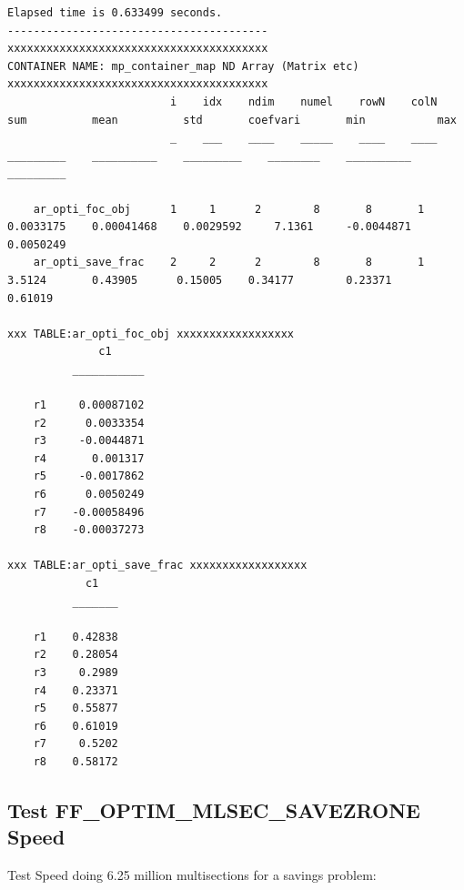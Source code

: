 \documentclass[
]{book}
\begin{document}
\begin{verbatim}
Elapsed time is 0.633499 seconds.
----------------------------------------
xxxxxxxxxxxxxxxxxxxxxxxxxxxxxxxxxxxxxxxx
CONTAINER NAME: mp_container_map ND Array (Matrix etc)
xxxxxxxxxxxxxxxxxxxxxxxxxxxxxxxxxxxxxxxx
                         i    idx    ndim    numel    rowN    colN       sum          mean          std       coefvari       min           max   
                         _    ___    ____    _____    ____    ____    _________    __________    _________    ________    __________    _________

    ar_opti_foc_obj      1     1      2        8       8       1      0.0033175    0.00041468    0.0029592     7.1361     -0.0044871    0.0050249
    ar_opti_save_frac    2     2      2        8       8       1         3.5124       0.43905      0.15005    0.34177        0.23371      0.61019

xxx TABLE:ar_opti_foc_obj xxxxxxxxxxxxxxxxxx
              c1     
          ___________

    r1     0.00087102
    r2      0.0033354
    r3     -0.0044871
    r4       0.001317
    r5     -0.0017862
    r6      0.0050249
    r7    -0.00058496
    r8    -0.00037273

xxx TABLE:ar_opti_save_frac xxxxxxxxxxxxxxxxxx
            c1   
          _______

    r1    0.42838
    r2    0.28054
    r3     0.2989
    r4    0.23371
    r5    0.55877
    r6    0.61019
    r7     0.5202
    r8    0.58172
\end{verbatim}

\hypertarget{test-ff_optim_mlsec_savezrone-speed}{%
\subsection{Test FF\_OPTIM\_MLSEC\_SAVEZRONE Speed}\label{test-ff_optim_mlsec_savezrone-speed}}

Test Speed doing 6.25 million multisections for a savings problem:
\end{document}
